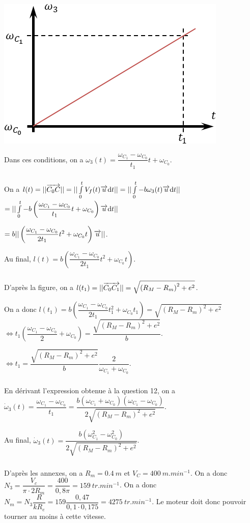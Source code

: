 \documentclass[10pt,fleqn]{article} %
\begin{document}
 \begin{center}
\includegraphics[width=.5\linewidth]{images/fig_05}
\end{center}

Dans ces conditions, on a $\omega_3(t)=\dfrac{\omega_{C_1}-\omega_{C_0}}{t_1}t+\omega_{C_0}$.

\subparagraph{} %
On a $l(t)=||\overrightarrow{C_0C}||=||\int\limits_0^t V_f(t)\overrightarrow{u} \text{d} t||=||\int\limits_0^t -b\omega_3(t) \overrightarrow{u} \text{d} t||$ 
$=||\int\limits_0^t -b\left( \dfrac{\omega_{C_1}-\omega_{C_0}}{t_1}t+\omega_{C_0}\right) \overrightarrow{u} \text{d} t||$

$=b|| \left(  \dfrac{\omega_{C_1}-\omega_{C_0}}{2t_1}t^2+\omega_{C_0}t\right) \overrightarrow{u} ||$.

Au final, 
$l(t)=b \left(  \dfrac{\omega_{C_1}-\omega_{C_0}}{2t_1}t^2+\omega_{C_0}t\right) $.


\subparagraph{} %
D'après la figure, on a  $l(t_1)=||\overrightarrow{C_0C_1}||=\sqrt{\left(R_M-R_m \right)^2+e^2}$.

On a donc $l(t_1)=b \left(  \dfrac{\omega_{C_1}-\omega_{C_0}}{2t_1}t_1^2+\omega_{C_0}t_1\right) =\sqrt{\left(R_M-R_m \right)^2+e^2}$ 
$\Leftrightarrow 
  t_1 \left(\dfrac{\omega_{C_1}-\omega_{C_0}}{2}+\omega_{C_0}\right) =\dfrac{\sqrt{\left(R_M-R_m \right)^2+e^2}}{b}$.

$\Leftrightarrow 
  t_1  =\dfrac{\sqrt{\left(R_M-R_m \right)^2+e^2}}{b} \dfrac{2}{\omega_{C_1}+\omega_{C_0}}$.


\subparagraph{} %

En dérivant l'expression obtenue à la question 12, on a 
$\dot{\omega}_3(t)=\dfrac{\omega_{C_1}-\omega_{C_0}}{t_1} =  \dfrac{b\left( \omega_{C_1}+\omega_{C_0}\right)\left( \omega_{C_1}-\omega_{C_0}\right)}{2\sqrt{\left(R_M-R_m \right)^2+e^2}}  $. 

Au final, $\dot{\omega}_3(t) =\dfrac{b\left( \omega_{C_1}^2-\omega_{C_0}^2\right)}{2\sqrt{\left(R_M-R_m \right)^2+e^2}}  $. 

\subparagraph{} %

D'après les annexes, on a $R_m=\SI{0,4}{m}$ et $V_C=\SI{400}{m.min^{-1}}$. On a donc $N_3=\dfrac{V_c}{\pi \cdot 2 R_m} = \dfrac{400}{0,8\pi} = \SI{159}{tr.min^{-1}}$. On a donc $N_m = N_3 \dfrac{R}{kR_e}=159 \dfrac{0,47}{0,1\cdot 0,175} = \SI{4275}{tr.min^{-1}}$. Le moteur doit donc pouvoir tourner au moins à cette vitesse.
\end{document}
